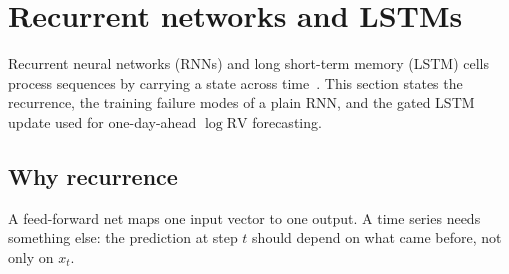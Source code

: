 \documentclass[12pt]{article}
\begin{document}
\section{Recurrent networks and LSTMs}
Recurrent neural networks (RNNs) and long short-term memory (LSTM) cells process
sequences by carrying a state across time~\cite{goodfellow2016}.
This section states the recurrence, the training failure modes of a plain RNN,
and the gated LSTM update used for one-day-ahead \(\log\mathrm{RV}\) forecasting.

\subsection{Why recurrence}
A feed-forward net maps one input vector to one output.
A time series needs something else: the prediction at step \(t\) should depend on
what came before, not only on \(x_t\).
\end{document}
